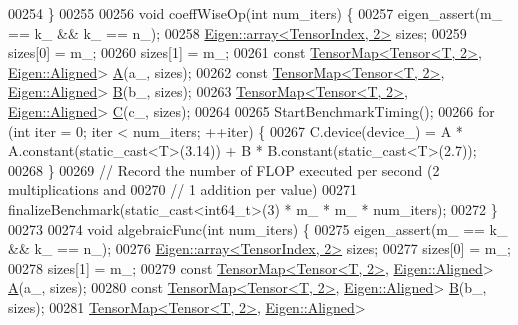 \begin{DoxyCode}
00254   \}
00255 
00256   \textcolor{keywordtype}{void} coeffWiseOp(\textcolor{keywordtype}{int} num\_iters) \{
00257     eigen\_assert(m\_ == k\_ && k\_ == n\_);
00258     \hyperlink{class_eigen_1_1array}{Eigen::array<TensorIndex, 2>} sizes;
00259     sizes[0] = m\_;
00260     sizes[1] = m\_;
00261     \textcolor{keyword}{const} \hyperlink{class_eigen_1_1_tensor_map}{TensorMap<Tensor<T, 2>}, \hyperlink{group__enums_gga45fe06e29902b7a2773de05ba27b47a1ad37d4c71425bb286e9b4103830538fbf}{Eigen::Aligned}> 
      \hyperlink{group___core___module_class_eigen_1_1_matrix}{A}(a\_, sizes);
00262     \textcolor{keyword}{const} \hyperlink{class_eigen_1_1_tensor_map}{TensorMap<Tensor<T, 2>}, \hyperlink{group__enums_gga45fe06e29902b7a2773de05ba27b47a1ad37d4c71425bb286e9b4103830538fbf}{Eigen::Aligned}> 
      \hyperlink{group___core___module_class_eigen_1_1_matrix}{B}(b\_, sizes);
00263     \hyperlink{class_eigen_1_1_tensor_map}{TensorMap<Tensor<T, 2>}, \hyperlink{group__enums_gga45fe06e29902b7a2773de05ba27b47a1ad37d4c71425bb286e9b4103830538fbf}{Eigen::Aligned}> 
      \hyperlink{group___core___module}{C}(c\_, sizes);
00264 
00265     StartBenchmarkTiming();
00266     \textcolor{keywordflow}{for} (\textcolor{keywordtype}{int} iter = 0; iter < num\_iters; ++iter) \{
00267       C.device(device\_) = A * A.constant(static\_cast<T>(3.14)) + B * B.constant(static\_cast<T>(2.7));
00268     \}
00269     \textcolor{comment}{// Record the number of FLOP executed per second (2 multiplications and}
00270     \textcolor{comment}{// 1 addition per value)}
00271     finalizeBenchmark(static\_cast<int64\_t>(3) * m\_ * m\_ * num\_iters);
00272   \}
00273 
00274   \textcolor{keywordtype}{void} algebraicFunc(\textcolor{keywordtype}{int} num\_iters) \{
00275     eigen\_assert(m\_ == k\_ && k\_ == n\_);
00276     \hyperlink{class_eigen_1_1array}{Eigen::array<TensorIndex, 2>} sizes;
00277     sizes[0] = m\_;
00278     sizes[1] = m\_;
00279     \textcolor{keyword}{const} \hyperlink{class_eigen_1_1_tensor_map}{TensorMap<Tensor<T, 2>}, \hyperlink{group__enums_gga45fe06e29902b7a2773de05ba27b47a1ad37d4c71425bb286e9b4103830538fbf}{Eigen::Aligned}> 
      \hyperlink{group___core___module_class_eigen_1_1_matrix}{A}(a\_, sizes);
00280     \textcolor{keyword}{const} \hyperlink{class_eigen_1_1_tensor_map}{TensorMap<Tensor<T, 2>}, \hyperlink{group__enums_gga45fe06e29902b7a2773de05ba27b47a1ad37d4c71425bb286e9b4103830538fbf}{Eigen::Aligned}> 
      \hyperlink{group___core___module_class_eigen_1_1_matrix}{B}(b\_, sizes);
00281     \hyperlink{class_eigen_1_1_tensor_map}{TensorMap<Tensor<T, 2>}, \hyperlink{group__enums_gga45fe06e29902b7a2773de05ba27b47a1ad37d4c71425bb286e9b4103830538fbf}{Eigen::Aligned}> 

\end{DoxyCode}
